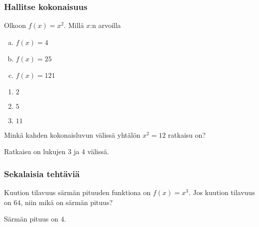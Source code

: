 \subsubsection*{Hallitse kokonaisuus}

\begin{tehtava}
Olkoon $f(x)=x^2$. Millä $x$:n arvoilla
\begin{enumerate}[a)]
\item $f(x)=4$
\item $f(x)=25$
\item $f(x)=121$
\end{enumerate}
\begin{vastaus}
\begin{enumerate}
\item $2$
\item $5$
\item $11$
\end{enumerate}
\end{vastaus}

\end{tehtava}
\begin{tehtava}
Minkä kahden kokonaisluvun välissä yhtälön $x^2 = 12$ ratkaisu on?
\begin{vastaus}
Ratkaisu on lukujen $3$ ja $4$ välissä.
\end{vastaus}
\end{tehtava}

\subsubsection*{Sekalaisia tehtäviä}

\begin{tehtava}
Kuution tilavuus särmän pituuden funktiona on $f(x) = x^3$. Jos kuution tilavuus on $64$, niin mikä on särmän pituus?
\begin{vastaus}
Särmän pituus on $4$.
\end{vastaus}
\end{tehtava}
